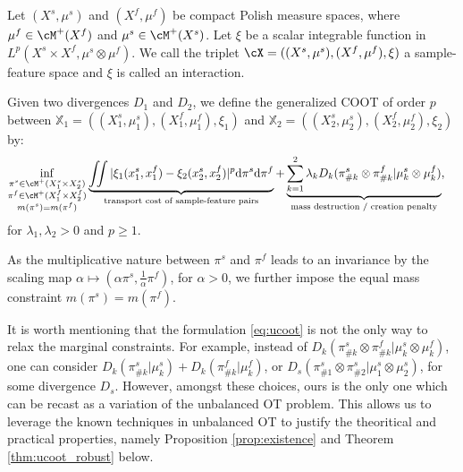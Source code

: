 \begin{definition}
Let $(X^s, \mu^s)$ and $(X^f, \mu^f)$ be compact Polish measure spaces, where $\mu^f \in \cM^+(X^f)$
and $\mu^s \in \cM^+(X^s)$. Let $\xi$ be a scalar integrable function in
$L^p(X^s \times X^f, \mu^s \otimes \mu^f)$. We call the triplet
$\cX = ((X^s, \mu^s), (X^f, \mu^f), \xi)$ a sample-feature space and $\xi$ is called an interaction.
\end{definition}
%
\begin{definition}
\label{def:ucoot}
Given two divergences $D_1$ and $D_2$, we define the generalized COOT of order $p$
between $\mathbb{X}_1 = ((X_1^s, \mu_1^s), (X_1^f, \mu_1^f), \xi_1)$ and
$\mathbb{X}_2 = ((X_2^s, \mu_2^s), (X_2^f, \mu_2^f), \xi_2)$ by:
\begin{equation}
\label{eq:ucoot}
  \begin{split}
  \inf_{\substack{\pi^s \in \cM^+(X_1^s \times X_2^s) \\
  \pi^f \in \cM^+(X_1^f \times X_2^f) \\ m(\pi^s) = m(\pi^f)}}
  &\underbrace{\iint |\xi_1(x_1^s, x_1^f) - \xi_2(x_2^s, x_2^f)|^p
  \mathrm d\pi^s\mathrm d \pi^f}_{\text{transport cost of sample-feature pairs}}
  + \underbrace{\sum_{k=1}^2\lambda_k D_k(\pi^s_{\#k} \otimes \pi^f_{\#k} |
  \mu^s_k \otimes \mu^f_k)}_{\text{mass destruction / creation penalty}},
  \end{split}
\end{equation}
for $\lambda_1, \lambda_2 >0$ and $p \geq 1$.
\end{definition}
As the multiplicative nature between $\pi^s$ and $\pi^f$ leads to an invariance by the scaling map
$\alpha \mapsto (\alpha \pi^s, \frac{1}{\alpha}\pi^f)$, for $\alpha > 0$,
we further impose the equal mass constraint $m(\pi^s) = m(\pi^f)$.

It is worth mentioning that the formulation \ref{eq:ucoot} is not the only way to
relax the marginal constraints. For example, instead of
$D_k(\pi^s_{\#k} \otimes \pi^f_{\#k} | \mu^s_k \otimes \mu^f_k)$,
one can consider $D_k(\pi^s_{\#k} | \mu^s_k) + D_k( \pi^f_{\#k} | \mu^f_k)$,
or $D_s(\pi^s_{\#1} \otimes \pi^s_{\#2} | \mu^s_1 \otimes \mu^s_2)$,
for some divergence $D_s$. However, amongst these choices,
ours is the only one which can be recast as a variation of the unbalanced OT problem.
This allows us to leverage the known techniques in unbalanced OT to justify
the theoritical and practical properties, namely Proposition \ref{prop:existence}
and Theorem \ref{thm:ucoot_robust} below.

